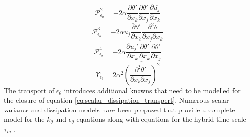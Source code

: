 \begin{equation}
\label{eq:scalar_dissipation_production2}
\mathcal{P}_{\epsilon_{\theta}}^{2} = -2\alpha\overline{\frac{\partial \theta'}{\partial x_{k}}\frac{\partial \theta'}{\partial x_{j}}}\frac{\partial \overline{u_{j}}}{\partial x_{k}}
\end{equation}
\begin{equation}
\label{eq:scalar_dissipation_production3}
\mathcal{P}_{\epsilon_{\theta}}^{3} = -2\alpha\overline{u_{j}\frac{\partial \theta'}{\partial x_{k}}} \frac{\partial^{2} \overline{\theta}}{\partial x_{j} \partial x_{k}}
\end{equation}
\begin{equation}
\label{eq:scalar_dissipation_production4}
\mathcal{P}_{\epsilon_{\theta}}^{4} = -2\alpha\overline{\frac{\partial u_{j}'}{\partial x_{k}}\frac{\partial \theta'}{\partial x_{k}} \frac{\partial \theta'}{\partial x_{j}}}
\end{equation}
\begin{equation}
\label{eq:scalar_dissipation_destruction}
\Upsilon_{\epsilon_{\theta}} = 2\alpha^{2}\overline{\left(\frac{\partial^{2} \theta'}{\partial x_{k} \partial x_{j}}\right)^{2}}
\end{equation}
The transport of $\epsilon_{\theta}$ introduces additional knowns that need to be modelled for the closure of equation \ref{eq:scalar_dissipation_transport}. Numerous scalar variance and dissipation models have been proposed that provide a complete model for the $k_{\theta}$ and $\epsilon_{\theta}$ equations along with equations for the hybrid time-scale $\tau_{m}$ \cite{Yoder2016}. 

